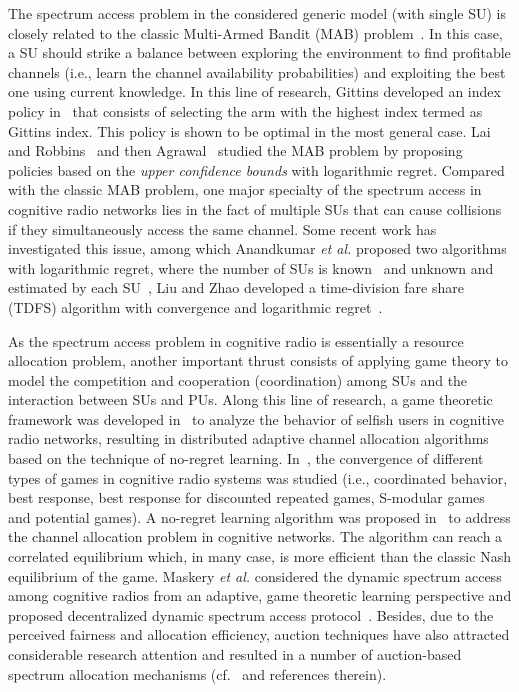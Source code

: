 \documentclass[12pt, onecolumn]{IEEEtran}
\theoremstyle{plain}
\theoremstyle{definition}
\begin{document}
The spectrum access problem in the considered gene\-ric model (with single SU) is closely related to the classic Multi-Armed Bandit (MAB) problem~\cite{Mahajan07}. In this case, a SU should strike a balance between exploring the environment to find profitable channels (i.e., learn the channel availability probabilities) and exploiting the best one using current knowledge. In this line of research, Gittins developed an index policy in~\cite{Gittins89} that consists of selecting the arm with the highest index termed as Gittins index. This policy is shown to be optimal in the most general case. Lai and Robbins~\cite{Lai85} and then Agrawal~\cite{Agrawal95} studied the MAB problem by proposing policies based on the {\it upper confidence bounds} with logarithmic regret. Compared with the classic MAB problem, one major specialty of the spectrum access in cognitive radio networks lies in the fact of multiple SUs that can cause collisions if they simultaneously access the same channel. Some recent work has investigated this issue, among which Anandkumar \textit{et al.} proposed two algorithms with logarithmic regret, where the number of SUs is known~\cite{Anand09} and unknown and estimated by each SU~\cite{Anand10}, Liu and Zhao developed a time-division fare share (TDFS) algorithm with convergence and logarithmic regret~\cite{Liu09}. 

As the spectrum access problem in cognitive radio is essentially a resource allocation problem, another important thrust consists of applying game theory to model the competition and cooperation (coordination) among SUs and the interaction between SUs and PUs. Along this line of research, a game theoretic framework was developed in~\cite{Nie06} to analyze the behavior of selfish users in cognitive radio networks, resulting in distributed adaptive channel allocation algorithms based on the technique of no-regret learning. In~\cite{Neel04}, the convergence of different types of games in cognitive radio systems was studied (i.e., coordinated behavior, best response, best response for discounted repeated games, S-modular games and potential games). A no-regret learning algorithm was proposed in~\cite{Han07} to address the channel allocation problem in cognitive networks. The algorithm can reach a correlated equilibrium which, in many case, is more efficient than the classic Nash equilibrium of the game. Maskery \textit{et al.} considered the dynamic spectrum access among cognitive radios from an adaptive, game theoretic learning perspective and proposed decentralized dynamic spectrum access protocol~\cite{Maskery09}. Besides, due to the perceived fairness and allocation efficiency, auction techniques have also attracted considerable research attention and resulted in a number of auction-based spectrum allocation mechanisms (cf.~\cite{infocom10} and references therein).
\end{document}
